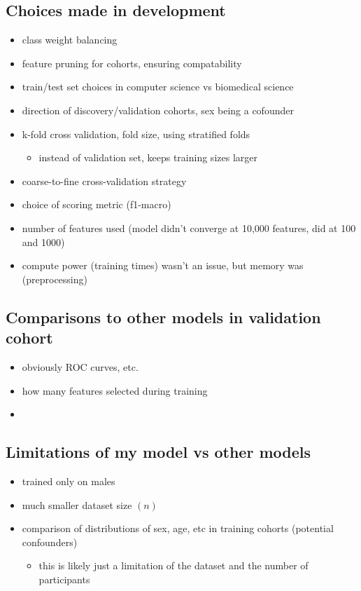 \documentclass{article}
\begin{document}
\subsection*{Choices made in development}
\begin{itemize}
    \item class weight balancing
    \item feature pruning for cohorts, ensuring compatability
    \item train/test set choices in computer science vs biomedical science
    \item direction of discovery/validation cohorts, sex being a cofounder
    \item k-fold cross validation, fold size, using stratified folds
          \begin{itemize}
              \item instead of validation set, keeps training sizes larger
          \end{itemize}
    \item coarse-to-fine cross-validation strategy
    \item choice of scoring metric (f1-macro)
    \item number of features used (model didn't converge at 10,000 features, did at 100 and 1000)
    \item compute power (training times) wasn't an issue, but memory was (preprocessing)
\end{itemize}

\subsection*{Comparisons to other models in validation cohort}
\begin{itemize}
    \item obviously ROC curves, etc.
    \item how many features selected during training
    \item
\end{itemize}

\subsection*{Limitations of my model vs other models}
\begin{itemize}
    \item trained only on males
    \item much smaller dataset size \((n)\)
    \item comparison of distributions of sex, age, etc in training cohorts (potential confounders)
          \begin{itemize}
              \item this is likely just a limitation of the dataset and the number of participants
          \end{itemize}
\end{itemize}
\end{document}
